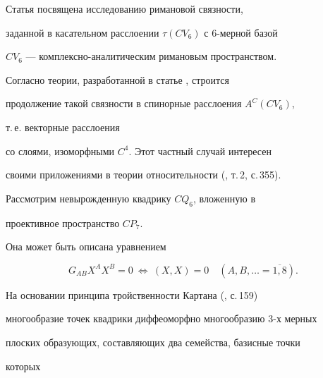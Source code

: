 \pagestyle{plain} %













\maketitle


\label{begin}





Статья посвящена исследованию римановой связности,


заданной в касательном расслоении $\tau (CV_6)$ с 6-мерной базой


$CV_6$ --- комплексно-аналитическим римановым пространством.


Согласно теории, разработанной в статье \cite{1}, строится


продолжение такой связности в спинорные расслоения $A^C(CV_6)$,


т.\,е. векторные расслоения


со слоями, изоморфными $C^4$. Этот частный случай интересен


своими приложениями в теории относительности (\cite{2}, т.\,2, с.\,355).





Рассмотрим невырожденную квадрику $CQ_6$, вложенную в


проективное пространство $CP_7$.


Она может быть описана уравнением


\begin{equation}


\label{e1a}


G_{AB}X^AX^B=0\ \Leftrightarrow\ (X,X)=0\quad


(A,B,\dotsc=\overline{1,8}).


\end{equation}


На основании принципа тройственности Картана (\cite{3}, с.\,159)


многообразие точек квадрики диффеоморфно многообразию 3-х мерных


плоских образующих, составляющих два семейства, базисные точки


которых


